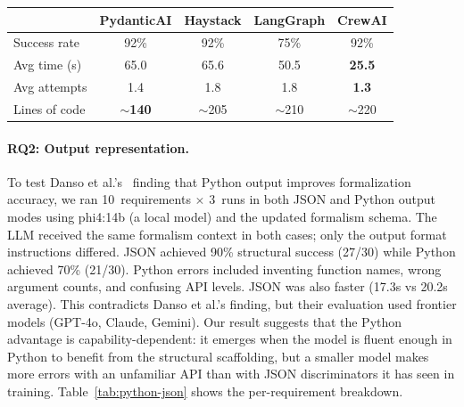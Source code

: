 \vspace{0.5em}
\noindent
\footnotesize
\renewcommand{\arraystretch}{1.3}
\begin{tabular*}{\columnwidth}{@{\extracolsep{\fill}}lcccc@{}}
\toprule
& \textbf{PydanticAI} & \textbf{Haystack} & \textbf{LangGraph} & \textbf{CrewAI} \\
\midrule
Success rate & 92\% & 92\% & 75\% & 92\% \\
Avg time (s) & 65.0 & 65.6 & 50.5 & \textbf{25.5} \\
Avg attempts & 1.4 & 1.8 & 1.8 & \textbf{1.3} \\
Lines of code & \textbf{${\sim}$140} & ${\sim}$205 & ${\sim}$210 & ${\sim}$220 \\
\bottomrule
\end{tabular*}
\label{tab:frameworks}
\renewcommand{\arraystretch}{1.0}
\normalsize
\vspace{0.5em}

\paragraph{RQ2: Output representation.}
To test Danso et al.'s~\cite{danso2026syntax} finding that Python output
improves formalization accuracy, we ran 10~requirements $\times$ 3~runs
in both JSON and Python output modes using phi4:14b (a local model) and
the updated formalism schema. The LLM received the same formalism context
in both cases; only the output format instructions differed. JSON
achieved 90\% structural success (27/30) while Python achieved 70\%
(21/30). Python errors included inventing function names, wrong argument
counts, and confusing API levels. JSON was also faster (17.3s vs 20.2s
average). This contradicts Danso et al.'s finding, but their evaluation
used frontier models (GPT-4o, Claude, Gemini). Our result suggests that
the Python advantage is capability-dependent: it emerges when the model
is fluent enough in Python to benefit from the structural scaffolding,
but a smaller model makes more errors with an unfamiliar API than with
JSON discriminators it has seen in training.
Table~\ref{tab:python-json} shows the per-requirement breakdown.

